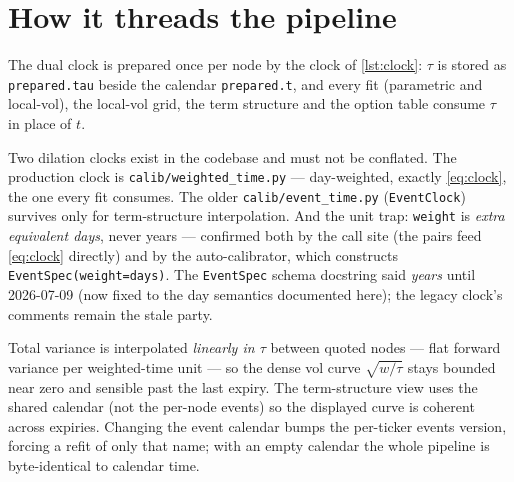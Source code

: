\documentclass[11pt]{article}
\begin{document}
\section{How it threads the pipeline}
\label{sec:thread}

The dual clock is prepared once per node by the clock of \cref{lst:clock}:
$\tau$ is stored as \texttt{prepared.tau} beside the calendar
\texttt{prepared.t}, and every fit (parametric and local-vol), the local-vol
grid, the term structure and the option table consume $\tau$ in place of
$t$.

\begin{remark}
Two dilation clocks exist in the codebase and must not be conflated. The
production clock is \texttt{calib/weighted\_time.py} --- day-weighted, exactly
\eqref{eq:clock}, the one every fit consumes. The older
\texttt{calib/event\_time.py} (\texttt{EventClock}) survives only for
term-structure interpolation. And the unit trap: \texttt{weight} is
\emph{extra equivalent days}, never years --- confirmed both by the call site
(the pairs feed \eqref{eq:clock} directly) and by the auto-calibrator, which
constructs \texttt{EventSpec(weight=days)}. The \texttt{EventSpec} schema
docstring said \emph{years} until 2026-07-09 (now fixed to the day semantics
documented here); the legacy clock's comments remain the stale party.
\end{remark}

Total variance is
interpolated \emph{linearly in $\tau$} between quoted nodes --- flat forward
variance per weighted-time unit --- so the dense vol curve $\sqrt{w/\tau}$ stays
bounded near zero and sensible past the last expiry. The term-structure view uses
the shared calendar (not the per-node events) so the displayed curve is coherent
across expiries. Changing the event calendar bumps the per-ticker events version,
forcing a refit of only that name; with an empty calendar the whole pipeline is
byte-identical to calendar time.
\end{document}
